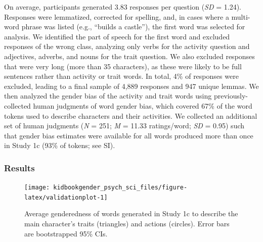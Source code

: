 \documentclass[
  english,
  ,man,floatsintext]{apa6}
\begin{document}
On average, participants generated 3.83 responses per question (\emph{SD} = 1.24). Responses were lemmatized, corrected for spelling, and, in cases where a multi-word phrase was listed (e.g., \enquote{builds a castle}), the first word was selected for analysis. We identified the part of speech for the first word and excluded responses of the wrong class, analyzing only verbs for the activity question and adjectives, adverbs, and nouns for the trait question. We also excluded responses that were very long (more than 35 characters), as these were likely to be full sentences rather than activity or trait words. In total, 4\% of responses were excluded, leading to a final sample of 4,889 responses and 947 unique lemmas. We then analyzed the gender bias of the activity and trait words using previously-collected human judgments of word gender bias, which covered 67\% of the word tokens used to describe characters and their activities. We collected an additional set of human judgments (\emph{N} = 251; \emph{M} = 11.33 ratings/word; \emph{SD} = 0.95) such that gender bias estimates were available for all words produced more than once in Study 1c (93\% of tokens; see SI).

\hypertarget{results-1}{%
\subsubsection{Results}\label{results-1}}

\begin{figure}[t]
\texttt{[image: kidbookgender\_psych\_sci\_files/figure-latex/validationplot-1]} \caption{Average genderedness of words generated in Study 1c to describe the main character's traits (triangles) and actions (circles). Error bars are bootstrapped 95\% CIs.}\label{fig:validationplot}
\end{figure}
\end{document}
